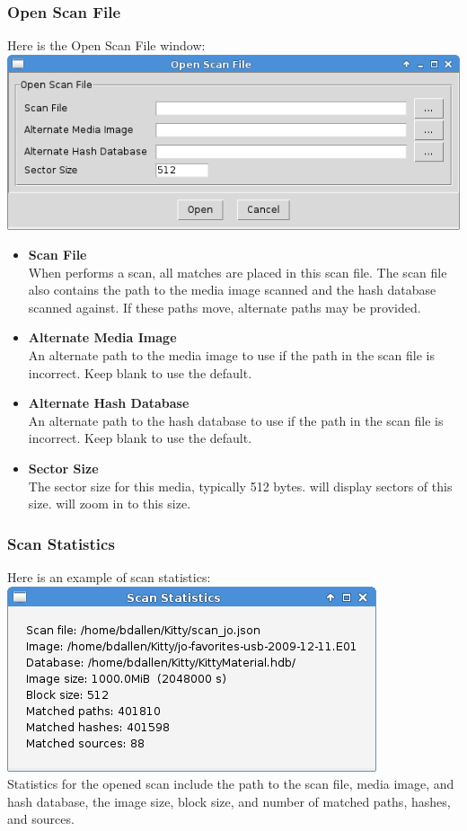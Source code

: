 \documentclass[11pt,fleqn]{article} %
\begin{document}
\subsubsection{Open Scan File}
Here is the Open Scan File window:\\
\includegraphics[scale=.4]{screenshots/open_scan_file}\\
\begin{itemize}
\item \textbf{Scan File}\\
When \hdb performs a scan, all matches are placed in this scan file. The scan file also contains the path to the media image scanned and the hash database scanned against. If these paths move, alternate paths may be provided.
\item \textbf{Alternate Media Image}\\
An alternate path to the media image to use if the path in the scan file is incorrect. Keep blank to use the default.
\item \textbf{Alternate Hash Database}\\
An alternate path to the hash database to use if the path in the scan file is incorrect. Keep blank to use the default.
\item \textbf{Sector Size}\\
The sector size for this media, typically 512 bytes. \sscope will display sectors of this size. \sscope will zoom in to this size.
\end{itemize}

\subsubsection{Scan Statistics}
Here is an example of scan statistics:\\
\includegraphics[scale=.4]{screenshots/scan_statistics}\\
Statistics for the opened scan include the path to the scan file, media image, and hash database, the image size, block size, and number of matched paths, hashes, and sources.
\end{document}
